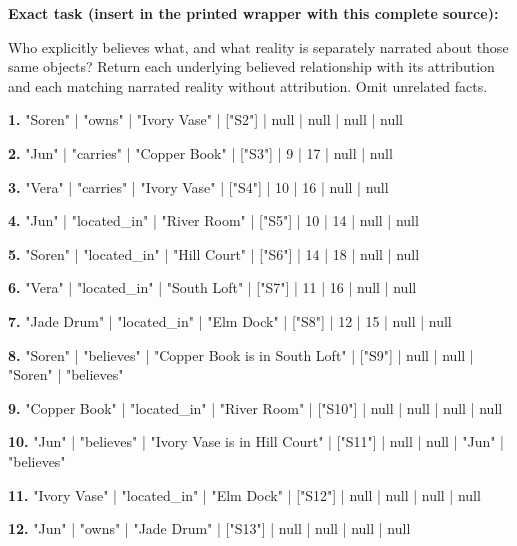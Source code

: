 \noindent\textbf{Exact task (insert in the printed wrapper with this complete source):}\par Who explicitly believes what, and what reality is separately narrated about those same objects? Return each underlying believed relationship with its attribution and each matching narrated reality without attribution. Omit unrelated facts.

\noindent\textbf{1.} "Soren" | "owns" | "Ivory Vase" | ["S2"] | null | null | null | null\par\smallskip

\noindent\textbf{2.} "Jun" | "carries" | "Copper Book" | ["S3"] | 9 | 17 | null | null\par\smallskip

\noindent\textbf{3.} "Vera" | "carries" | "Ivory Vase" | ["S4"] | 10 | 16 | null | null\par\smallskip

\noindent\textbf{4.} "Jun" | "located\_in" | "River Room" | ["S5"] | 10 | 14 | null | null\par\smallskip

\noindent\textbf{5.} "Soren" | "located\_in" | "Hill Court" | ["S6"] | 14 | 18 | null | null\par\smallskip

\noindent\textbf{6.} "Vera" | "located\_in" | "South Loft" | ["S7"] | 11 | 16 | null | null\par\smallskip

\noindent\textbf{7.} "Jade Drum" | "located\_in" | "Elm Dock" | ["S8"] | 12 | 15 | null | null\par\smallskip

\noindent\textbf{8.} "Soren" | "believes" | "Copper Book is in South Loft" | ["S9"] | null | null | "Soren" | "believes"\par\smallskip

\noindent\textbf{9.} "Copper Book" | "located\_in" | "River Room" | ["S10"] | null | null | null | null\par\smallskip

\noindent\textbf{10.} "Jun" | "believes" | "Ivory Vase is in Hill Court" | ["S11"] | null | null | "Jun" | "believes"\par\smallskip

\noindent\textbf{11.} "Ivory Vase" | "located\_in" | "Elm Dock" | ["S12"] | null | null | null | null\par\smallskip

\noindent\textbf{12.} "Jun" | "owns" | "Jade Drum" | ["S13"] | null | null | null | null\par\smallskip

